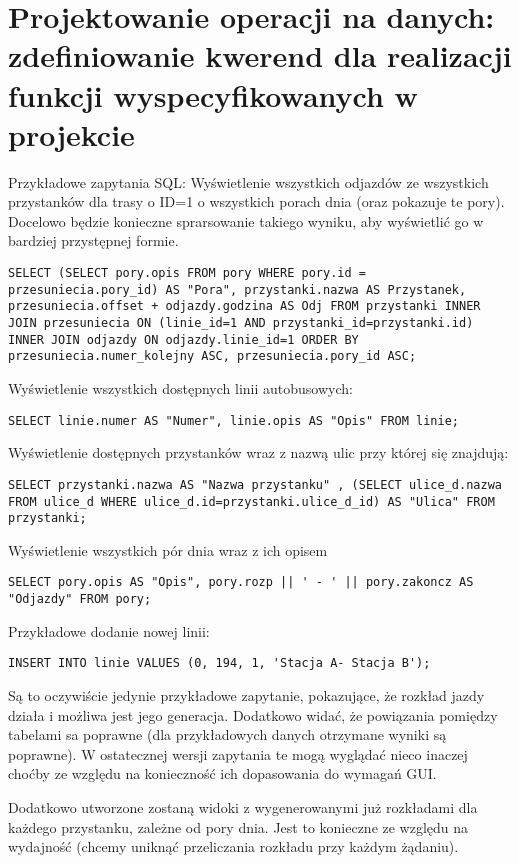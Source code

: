 \section{Projektowanie operacji na danych: zdefiniowanie kwerend dla realizacji funkcji wyspecyfikowanych w projekcie}

Przykładowe zapytania SQL:
Wyświetlenie wszystkich odjazdów ze wszystkich przystanków dla trasy o ID=1 o wszystkich porach dnia (oraz pokazuje te pory). Docelowo będzie konieczne sprarsowanie takiego wyniku, aby wyświetlić go w bardziej przystępnej formie.
\begin{verbatim}
SELECT (SELECT pory.opis FROM pory WHERE pory.id = przesuniecia.pory_id) AS "Pora", przystanki.nazwa AS Przystanek, przesuniecia.offset + odjazdy.godzina AS Odj FROM przystanki INNER JOIN przesuniecia ON (linie_id=1 AND przystanki_id=przystanki.id) INNER JOIN odjazdy ON odjazdy.linie_id=1 ORDER BY przesuniecia.numer_kolejny ASC, przesuniecia.pory_id ASC;
\end{verbatim}

Wyświetlenie wszystkich dostępnych linii autobusowych:
\begin{verbatim}
SELECT linie.numer AS "Numer", linie.opis AS "Opis" FROM linie;
\end{verbatim}


Wyświetlenie dostępnych przystanków wraz z nazwą ulic przy której się znajdują:
\begin{verbatim}
SELECT przystanki.nazwa AS "Nazwa przystanku" , (SELECT ulice_d.nazwa FROM ulice_d WHERE ulice_d.id=przystanki.ulice_d_id) AS "Ulica" FROM przystanki;
\end{verbatim}

Wyświetlenie wszystkich pór dnia wraz z ich opisem
\begin{verbatim}
SELECT pory.opis AS "Opis", pory.rozp || ' - ' || pory.zakoncz AS "Odjazdy" FROM pory;
\end{verbatim}


Przykładowe dodanie nowej linii:
\begin{verbatim}
INSERT INTO linie VALUES (0, 194, 1, 'Stacja A- Stacja B');
\end{verbatim}

Są to oczywiście jedynie przykładowe zapytanie, pokazujące, że rozkład jazdy działa i możliwa jest jego generacja. Dodatkowo widać, że powiązania pomiędzy tabelami sa poprawne (dla przykładowych danych otrzymane wyniki są poprawne). W ostatecznej wersji zapytania te mogą wyglądać nieco inaczej choćby ze względu na konieczność ich dopasowania do wymagań GUI.

Dodatkowo utworzone zostaną widoki z wygenerowanymi już rozkładami dla każdego przystanku, zależne od pory dnia. Jest to konieczne ze względu na wydajność (chcemy uniknąć przeliczania rozkładu przy każdym żądaniu).
